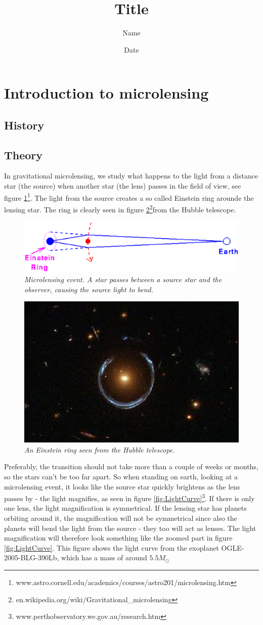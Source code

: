\documentclass[12pt,a4paper,oneside]{scrartcl}
\title{Title}
\author{Name}
\date{Date}
\begin{document}
\section{Introduction to microlensing}
\subsection{History}
\subsection{Theory}
In gravitational microlensing, we study what happens to the light from a distance star (the source) when another star (the lens) passes in the field of view, see figure \ref{fig:Microlens_draw}\footnote{www.astro.cornell.edu/academics/courses/astro201/microlensing.htm}. The light from the source creates a so called Einstein ring arounde the lensing star. The ring is clearly seen in figure \ref{fig:EinsteinRing}\footnote{en.wikipedia.org/wiki/Gravitational\_microlensing}from the Hubble telescope.
\begin{figure}[h]
\centering
\includegraphics[width=0.7 \textwidth]{microlens_draw}
\caption{\emph{Microlensing event. A star passes between a source star and the observer, causing the source light to bend.}}\label{fig:Microlens_draw}
\end{figure}
\begin{figure}[h]
\centering
\includegraphics[width=0.3 \textwidth]{Wiki_A_Horseshoe_Einstein_Ring_from_Hubble}
\caption{\emph{An Einstein ring seen from the Hubble telescope.}\label{fig:EinsteinRing}}
\end{figure}
Preferably, the transition should not take more than a couple of weeks or months, so the stars can't be too far apart. So when standing on earth, looking at a microlensing event, it looks like the source star quickly brightens as the lens passes by - the light magnifies, as seen in figure \ref{fig:LightCurve}\footnote{www.perthobservatory.we.gov.au/research.htm}. If there is only one lens, the light magnification is symmetrical. If the lensing star has planets orbiting around it, the magnification will not be symmetrical since also the planets will bend the light from the source - they too will act as lenses. The light magnification will therefore look something like the zoomed part in figure \ref{fig:LightCurve}. This figure shows the light curve from the exoplanet OGLE-2005-BLG-390Lb, which has a mass of around $5.5M_{\odot}$
\end{document}
